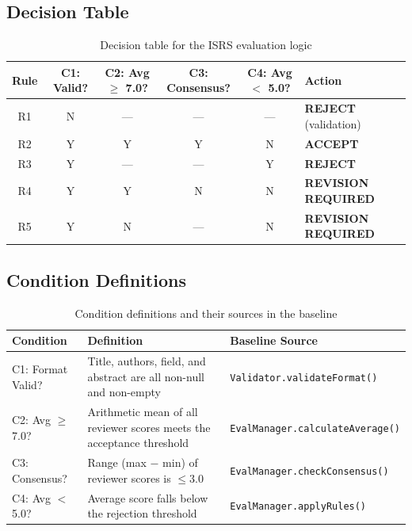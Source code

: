 \documentclass[12pt, a4paper]{article}
\begin{document}
\subsection{Decision Table}

\begin{table}[h]
\centering
\caption{Decision table for the ISRS evaluation logic}
\label{tab:decision-table}
\begin{tabular}{c c c c c l}
    \toprule
    \textbf{Rule} & \textbf{C1: Valid?} & \textbf{C2: Avg $\geq$ 7.0?} & \textbf{C3: Consensus?} & \textbf{C4: Avg $<$ 5.0?} & \textbf{Action} \\
    \midrule
    R1 & N & --- & --- & --- & \textbf{REJECT} (validation) \\
    R2 & Y & Y   & Y   & N   & \textbf{ACCEPT} \\
    R3 & Y & --- & --- & Y   & \textbf{REJECT} \\
    R4 & Y & Y   & N   & N   & \textbf{REVISION REQUIRED} \\
    R5 & Y & N   & --- & N   & \textbf{REVISION REQUIRED} \\
    \bottomrule
\end{tabular}
\end{table}

\subsection{Condition Definitions}

\begin{table}[h]
\centering
\caption{Condition definitions and their sources in the baseline}
\label{tab:condition-defs}
\begin{tabularx}{\textwidth}{l X l}
    \toprule
    \textbf{Condition} & \textbf{Definition} & \textbf{Baseline Source} \\
    \midrule
    C1: Format Valid? & Title, authors, field, and abstract are all non-null and non-empty & \texttt{Validator.validateFormat()} \\
    C2: Avg $\geq$ 7.0? & Arithmetic mean of all reviewer scores meets the acceptance threshold & \texttt{EvalManager.calculateAverage()} \\
    C3: Consensus? & Range (max $-$ min) of reviewer scores is $\leq 3.0$ & \texttt{EvalManager.checkConsensus()} \\
    C4: Avg $<$ 5.0? & Average score falls below the rejection threshold & \texttt{EvalManager.applyRules()} \\
    \bottomrule
\end{tabularx}
\end{table}
\end{document}
